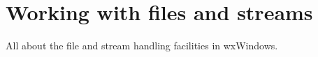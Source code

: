 \chapter{Working with files and streams}\label{chapfilestream}
%
%
\setfooter{\thepage}{}{}{}{}{\thepage}%

All about the file and stream handling facilities in wxWindows.

